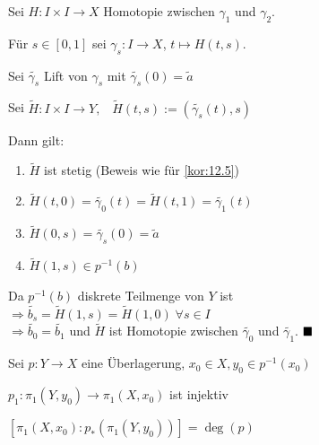 \begin{beweis}
    Sei $H: I \times I \rightarrow X$ Homotopie zwischen $\gamma_1$
    und $\gamma_2$.

    Für $s \in [0,1]$ sei $\gamma_s: I \rightarrow X$, $t \mapsto H(t,s)$.

    Sei $\tilde{\gamma_s}$ Lift von $\gamma_s$ mit $\tilde{\gamma_s}(0) = \tilde{a}$

    Sei $\tilde{H}: I \times I \rightarrow Y,\;\;\; \tilde{H}(t,s) := (\tilde{\gamma_s}(t), s)$

    Dann gilt:
    \begin{enumerate}[label=(\roman*)]
        \item $\tilde{H}$ ist stetig (Beweis wie für \cref{kor:12.5})
        \item $\tilde{H}(t,0) = \tilde{\gamma_0}(t) = \tilde{H}(t,1) = \tilde{\gamma_1}(t)$
        \item $\tilde{H}(0,s) = \tilde{\gamma_s}(0) = \tilde{a}$
        \item $\tilde{H}(1,s) \in p^{-1}(b)$
    \end{enumerate}

    Da $p^{-1}(b)$ diskrete Teilmenge von $Y$ ist\\
    $\Rightarrow \tilde{b_s} = \tilde{H}(1,s) = \tilde{H}(1,0) \;\forall s \in I$\\
    $\Rightarrow \tilde{b_0} = \tilde{b_1}$ und $\tilde{H}$ ist Homotopie 
    zwischen $\tilde{\gamma_0}$ und $\tilde{\gamma_1}$. $\qed$
\end{beweis}

\begin{folgerung}%
    Sei $p: Y \rightarrow X$ eine Überlagerung, $x_0 \in X, y_0 \in p^{-1}(x_0)$
    \begin{bemenum}
        \item \label{folg:12.8a} $p_1: \pi_1(Y, y_0) \rightarrow \pi_1(X, x_0)$ ist injektiv\label{kor:12.8a}
        \item \label{folg:12.8b} $[\pi_1(X, x_0): p_* (\pi_1(Y, y_0))] = \deg(p)$\label{kor:12.8b}
    \end{bemenum}
\end{folgerung}

